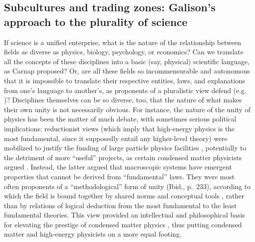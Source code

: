 \documentclass[smallextended]{svjour3}
\begin{document}
\subsection{Subcultures and trading zones: Galison's approach to the plurality of science}\label{section:galison}

If science is a unified enterprise, what is the nature of the relationship between fields as diverse as physics, biology, psychology, or economics? Can we translate all the concepts of these disciplines into a basic (say, physical) scientific language, as Carnap proposed? Or, are all these fields so incommensurable and autonomous that it is impossible to translate their respective entities, laws, and explanations from one's language to another's, as proponents of a pluralistic view defend (e.g. \citet{Suppes1978,Dupre1983,Cartwright1999})? Disciplines themselves can be so diverse, too, that the nature of what makes their own unity is not necessarily obvious. For instance, the nature of the unity of physics has been the matter of much debate, with sometimes serious political implications: reductionist views (which imply that high-energy physics is the most fundamental, since it supposedly entail any higher-level theory) were mobilized to justify the funding of large particle physics facilities \citep{Cat1998}, potentially to the detriment of more ``useful'' projects, as certain condensed matter physicists argued \citep[Ch.~9]{martin2018solid}. Instead, the latter argued that macroscopic systems have emergent properties that cannot be derived from ``fundamental'' laws. They were most often proponents of a ``methodological'' form of unity (Ibid., p.~233), according to which the field is bound together by shared norms and conceptual tools \citep[p.~267]{Cat1998}, rather than by relations of logical deduction from the most fundamental to the least fundamental theories. This view provided an intellectual and philosophical basis for elevating the prestige of condensed matter physics \citep[p.~148--149]{martin2018solid}, thus putting condensed matter and high-energy physicists on a more equal footing.
\end{document}
